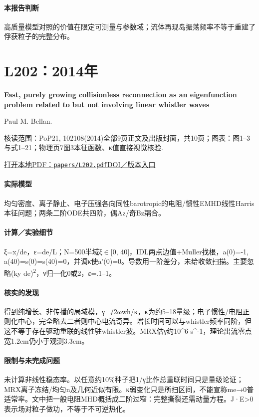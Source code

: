 \paragraph{本报告判断}高质量模型对照的价值在限定可测量与参数域；流体再现岛振荡频率不等于重建了俘获粒子的完整分布。

\section{L202：2014年}\label{paper:L202}

\textbf{Fast,  purely growing collisionless reconnection as an eigenfunction problem related to but not involving linear whistler waves}\citep{L202}\

Paul M. Bellan.

\textsf{核读范围：}PoP21, 102108(2014)全部9页正文及出版封面，共10页；\textsf{图表：}图1–3与式1–21；物理页7图3本征函数、κ值直接视觉核验.

\href{run:papers/L202.pdf}{打开本地PDF：\texttt{papers/L202.pdf}}\quad\href{https://doi.org/10.1063/1.4897375}{DOI／版本入口}

\paragraph{实际模型}均匀密度、离子静止、电子压强各向同性barotropic的电阻/惯性EMHD线性Harris本征问题；两条二阶ODE共四阶，偶Az/奇Bz耦合。

\paragraph{计算／实验细节}ξ=x/de，ε=de/L；N=500半域ξ\ensuremath{\in}[0, 40]，IDL两点边值+Muller找根，a(0)=-1, a(40)=s(0)=s(40)=0，并调κ使a'(0)=0。导数用一阶差分，未给收敛扫描。主要忽略(ky de)\textsuperscript{2}，ν归一化0或2，ε=.1–1。

\paragraph{核实的发现}得到纯增长、非传播的局域模，γ=√2ωwh/κ，κ为约5–18量级；电子惯性/电阻正则化中心，完全略去二者则中心电流奇异。增长时间可以与whistler频率同阶，但这不等于存在驱动重联的线性驻whistler波。MRX估γ约10\textasciicircum{}6 s\textasciicircum{}-1，理论出流零点宽1.2cm仍小于观测3.3cm。

\paragraph{限制与未完成问题}未计算非线性稳态率。以任意约10\%种子把1/γ比作总重联时间只是量级论证；MRX离子冻结/均匀n及几何近似有限。κ弱变化只是所扫区间，不能宣称me→0普适常率。文中把一般电阻MHD概括成二阶过窄：完整撕裂还需动量方程。J·E>0表示场对粒子做功，不等于不可逆热化。

